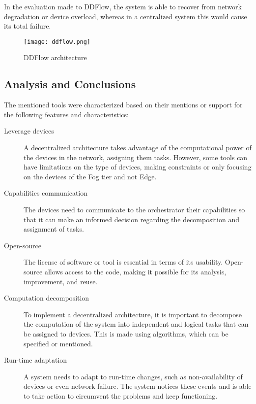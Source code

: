 In the evaluation made to DDFlow, the system is able to recover from network degradation or device overload, whereas in a centralized system this would cause its total failure.

\begin{figure}[h]
\centering
\texttt{[image: ddflow.png]}
\caption[DDFlow architecture]{DDFlow architecture~\cite{ddflow}}\label{fig:ddflow}
\end{figure}

\subsection{Analysis and Conclusions}\label{sec:decentralized_sota_conclusions}

The mentioned tools were characterized based on their mentions or support for the following features and characteristics:

\begin{description}
    \item [Leverage devices] A decentralized architecture takes advantage of the computational power of the devices in the network, assigning them tasks. However, some tools can have limitations on the type of devices, making constraints or only focusing on the devices of the Fog tier and not Edge.
    \item [Capabilities communication] The devices need to communicate to the orchestrator their capabilities so that it can make an informed decision regarding the decomposition and assignment of tasks.
    \item [Open-source] The license of software or tool is essential in terms of its usability. Open-source allows access to the code, making it possible for its analysis, improvement, and reuse.
    \item [Computation decomposition] To implement a decentralized architecture, it is important to decompose the computation of the system into independent and logical tasks that can be assigned to devices. This is made using algorithms, which can be specified or mentioned.
    \item [Run-time adaptation] A system needs to adapt to run-time changes, such as non-availability of devices or even network failure. The system notices these events and is able to take action to circumvent the problems and keep functioning.
\end{description}

